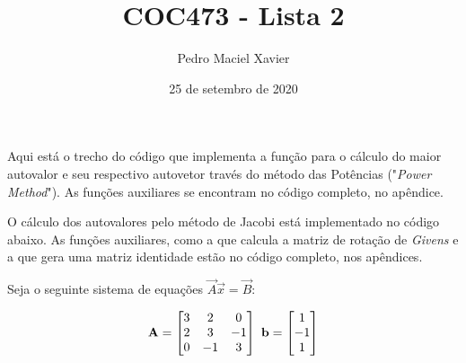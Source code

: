 \documentclass{homework}
\title{COC473 - Lista 2}
\author{Pedro Maciel Xavier}
\date{25 de setembro de 2020}
\begin{document}
	
	\maketitle
	
	\quest%
	
	Aqui está o trecho do código que implementa a função para o cálculo do maior autovalor e seu respectivo autovetor través do método das Potências ("\textit{Power Method}"). As funções auxiliares se encontram no código completo, no apêndice.
	
	
	 
	\quest%
	
	O cálculo dos autovalores pelo método de Jacobi está implementado no código abaixo. As funções auxiliares, como a que calcula a matriz de rotação de \textit{Givens} e a que gera uma matriz identidade estão no código completo, nos apêndices.
	
	
	
	\quest%
		Seja o seguinte sistema de equações $\vec{A} \vec{x} = \vec{B}$:
	
		$$
		\vec{A} = \left[\begin{array}{@{}ccc@{}}
		 3 &  2 &  0 \\
		 2 &  3 & -1 \\
		 0 & -1 &  3
		\end{array}\right]
		~
		\vec{b} = \left[\begin{array}{@{}c@{}}
		 1 \\
		-1 \\
		 1 
		\end{array}\right]
		$$
	
\end{document}
